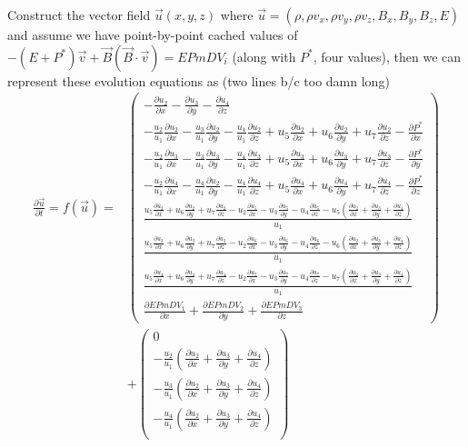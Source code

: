 \documentclass[10pt]{article}
\newcommand{\pd}[2]{\frac{\partial#1}{\partial#2}}
\begin{document}
Construct the vector field $\vec{u}(x,y,z)$ where $\vec{u} = (\rho, \rho v_x, \rho v_y, \rho v_z, B_x, B_y, B_z, E)$ and assume we have point-by-point cached values of $-(E + P^*)\vec{v} + \vec{B}(\vec{B} \cdot \vec{v})  = EPmDV_i$ (along with $P^*$, four values), then we can represent these evolution equations as (two lines b/c too damn long)
\begin{align}
    \pd{\vec{u}}{t} = f(\vec{u}) {}=& \begin{pmatrix} 
        -\pd{u_2}{x} - \pd{u_3}{y} - \pd{u_4}{z}\\[10pt]
        -\frac{u_2}{u_1}\pd{u_2}{x}-\frac{u_3}{u_1}\pd{u_2}{y}-\frac{u_4}{u_1}\pd{u_2}{z} + u_5\pd{u_2}{x} + u_6\pd{u_2}{y} + u_7\pd{u_2}{z} - \pd{P^*}{x}\\[10pt]
        -\frac{u_2}{u_1}\pd{u_3}{x}-\frac{u_3}{u_1}\pd{u_3}{y}-\frac{u_4}{u_1}\pd{u_3}{z} + u_5\pd{u_3}{x} + u_6\pd{u_3}{y} + u_7\pd{u_3}{z} - \pd{P^*}{y}\\[10pt]
        -\frac{u_2}{u_1}\pd{u_4}{x}-\frac{u_4}{u_1}\pd{u_2}{y}-\frac{u_4}{u_1}\pd{u_4}{z} + u_5\pd{u_4}{x} + u_6\pd{u_4}{y} + u_7\pd{u_4}{z} - \pd{P^*}{z}\\[10pt]
        \frac{u_5\pd{u_2}{x} + u_6\pd{u_2}{y} + u_7\pd{u_2}{z} - u_2\pd{u_5}{x} - u_3\pd{u_5}{y} - u_4\pd{u_5}{z} - u_5\left(\pd{u_2}{x} + \pd{u_3}{y} + \pd{u_4}{z}\right)}{u_1}\\[10pt]
        \frac{u_5\pd{u_3}{x} + u_6\pd{u_3}{y} + u_7\pd{u_3}{z} - u_2\pd{u_6}{x} - u_3\pd{u_6}{y} - u_4\pd{u_6}{z} - u_6\left(\pd{u_2}{x} + \pd{u_3}{y} + \pd{u_4}{z}\right)}{u_1}\\[10pt]
        \frac{u_5\pd{u_4}{x} + u_6\pd{u_4}{y} + u_7\pd{u_4}{z} - u_2\pd{u_7}{x} - u_3\pd{u_7}{y} - u_4\pd{u_7}{z} - u_7\left(\pd{u_2}{x} + \pd{u_3}{y} + \pd{u_4}{z}\right)}{u_1}\\[10pt]
        \pd{EPmDV_1}{x} + \pd{EPmDV_2}{y} + \pd{EPmDV_3}{z}
    \end{pmatrix} \nonumber\\
    &+ \begin{pmatrix}
        0\\
        - \frac{u_2}{u_1}\left(\pd{u_2}{x} + \pd{u_3}{y} + \pd{u_4}{z}\right)\\[10pt]
        - \frac{u_3}{u_1}\left(\pd{u_2}{x} + \pd{u_3}{y} + \pd{u_4}{z}\right)\\[10pt]
        - \frac{u_4}{u_1}\left(\pd{u_2}{x} + \pd{u_3}{y} + \pd{u_4}{z}\right)\\[10pt]
    \end{pmatrix}
\end{align}
\end{document}
